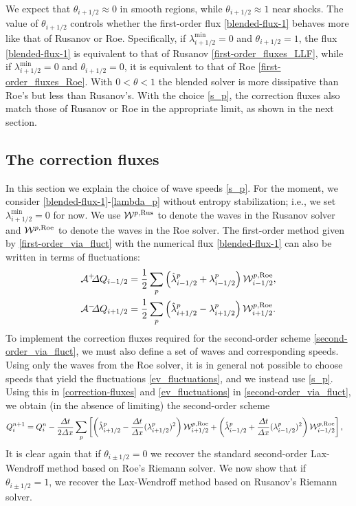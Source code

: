 \documentclass[preprint, 11pt]{article}
\newcommand{\W}{{\mathcal W}}
\newcommand{\A}{{\mathcal A}}
\newcommand{\apdq}{\A^+ \!\!{\Delta} Q}
\newcommand{\amdq}{\A^- \!\!{\Delta} Q}
\newcommand{\imh}{{i-1/2}}
\newcommand{\iph}{{i+1/2}}
\newcommand{\bfq}{{Q}}
\newcommand{\Rus}{{\rm Rus}}
\newcommand{\Roe}{{\rm Roe}}
\begin{document}
We expect that $\theta_\iph\approx 0 $ in smooth regions,
while $\theta_\iph\approx 1$ near shocks.
The value of $\theta_\iph$ controls whether the first-order flux \eqref{blended-flux-1}
behaves more like that of Rusanov or Roe.
Specifically, if $\lambda_\iph^{\min}=0$ and $\theta_\iph=1$, the flux \eqref{blended-flux-1}
is equivalent to that of Rusanov \eqref{first-order_fluxes_LLF},
while if $\lambda_\iph^{\min}=0$ and $\theta_\iph=0$, it is equivalent to that of Roe \eqref{first-order_fluxes_Roe}.
With $0<\theta<1$ the blended solver is more dissipative than Roe's but less than Rusanov's.
With the choice \eqref{s_p}, the correction fluxes also match
those of Rusanov or Roe in the appropriate limit, as shown in the next section.

\subsection{The correction fluxes}
In this section we explain the choice of wave speeds \eqref{s_p}.
For the moment, we consider \eqref{blended-flux-1}-\eqref{lambda_p} without
entropy stabilization; i.e., we set $\lambda^{\min}_\iph=0$
for now.
We use $\W^{p,\Rus}$ to denote the waves in the Rusanov
solver and $\W^{p,\Roe}$ to denote the waves in the Roe solver.
The first-order method given by \eqref{first-order_via_fluct} with the numerical
flux \eqref{blended-flux-1} can also be written in
terms of fluctuations:
\begin{subequations}\label{ev_fluctuations}
\begin{align}
  \apdq_\imh & = \frac{1}{2}\sum_p \left(\hat\lambda_{i-1/2}^p + \lambda_{i-1/2}^p\right)\W_{i-1/2}^{p,\Roe}, \\
  \amdq_\iph & = \frac{1}{2}\sum_p \left(\hat\lambda_{i+1/2}^p - \lambda_{i+1/2}^p\right)\W_{i+1/2}^{p,\Roe}.
\end{align}
\end{subequations}
To implement the correction fluxes required for the second-order scheme \eqref{second-order_via_fluct},
we must also define a set of waves and corresponding speeds.
Using only the waves from the Roe solver, it is in general not possible
to choose speeds that yield the fluctuations \eqref{ev_fluctuations},
and we instead use \eqref{s_p}.
Using this in \eqref{correction-fluxes} and \eqref{ev_fluctuations} in 
\eqref{second-order_via_fluct}, we obtain (in the absence of limiting)
the second-order scheme
\begin{align}\label{LWL}
  \bfq_i^{n+1}=\bfq_i^n
  &-\frac{\Delta t}{2 \Delta x}
  \sum_p
  \left[\left(\hat\lambda_{i+1/2}^p -\frac{\Delta t}{\Delta x}(\lambda_{i+1/2}^p)^2 \right)\W_{i+1/2}^{p,\Roe}
  +
  \left(\hat\lambda_{i-1/2}^p +\frac{\Delta t}{\Delta x}(\lambda_{i-1/2}^p)^2 \right)\W_{i-1/2}^{p,\Roe}\right],
\end{align}
It is clear again that if $\theta_{i\pm 1/2}=0$ we recover the standard
second-order Lax-Wendroff method based on Roe's Riemann solver.
We now show that if $\theta_{i\pm 1/2}=1$, we recover the Lax-Wendroff method
based on Rusanov's Riemann solver.
\end{document}
